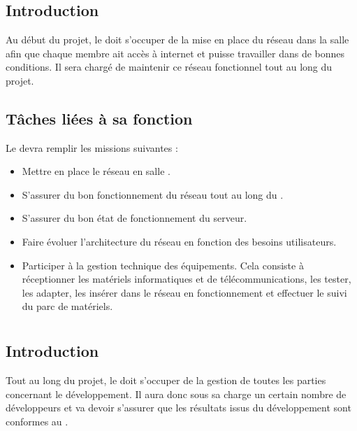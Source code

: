 \newpage
\section{\RRS}
\subsection*{Introduction}

Au début du projet, le \RRS{} doit s'occuper de la mise en place du réseau dans la salle \PICCourt afin que chaque membre ait accès à internet et puisse travailler dans de bonnes conditions. Il sera chargé de maintenir ce réseau fonctionnel tout au long du projet.

\subsection*{Tâches liées à sa fonction}

Le \RRS{} devra remplir les missions suivantes :
\begin{itemize}
	\item Mettre en place le réseau en salle \PICCourt.
	\item S'assurer du bon fonctionnement du réseau tout au long du \PICCourt.
	\item S'assurer du bon état de fonctionnement du serveur.
	\item Faire évoluer l'architecture du réseau en fonction des besoins utilisateurs.
	\item Participer à la gestion technique des équipements. Cela consiste à réceptionner les matériels informatiques et de télécommunications, les tester, les adapter, les insérer dans le réseau en fonctionnement et effectuer le suivi du parc de matériels.
\end{itemize}

\newpage
\section{\RD}
\subsection*{Introduction}

Tout au long du projet, le \RD{} doit s'occuper de la gestion de toutes les parties concernant le développement. Il aura donc sous sa charge un certain nombre de développeurs et va devoir s'assurer que les résultats issus du développement sont conformes au \DGQDEUXCourt.

